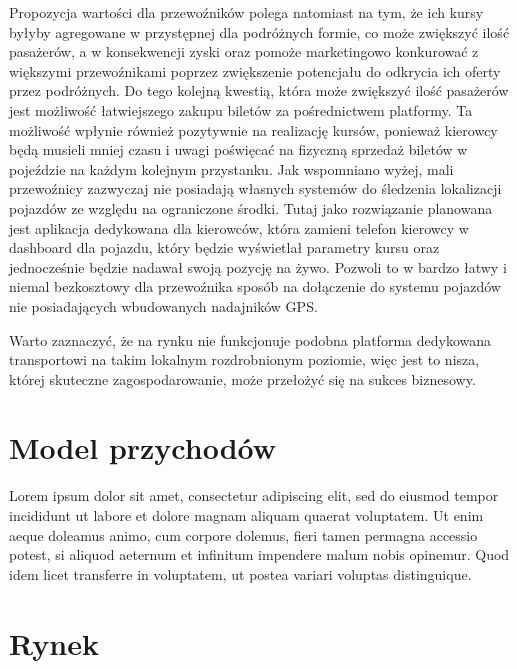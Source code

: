 Propozycja wartości dla przewoźników polega natomiast na tym, że ich kursy byłyby agregowane w przystępnej dla podróżnych formie, co może zwiększyć ilość pasażerów, a w konsekwencji zyski oraz pomoże marketingowo konkurować z większymi przewoźnikami poprzez zwiększenie potencjału do odkrycia ich oferty przez podróżnych. Do tego kolejną kwestią, która może zwiększyć ilość pasażerów jest możliwość łatwiejszego zakupu biletów za pośrednictwem platformy. Ta możliwość wpłynie również pozytywnie na realizację kursów, ponieważ kierowcy będą musieli mniej czasu i uwagi poświęcać na fizyczną sprzedaż biletów w pojeździe na każdym kolejnym przystanku. Jak wspomniano wyżej, mali przewoźnicy zazwyczaj nie posiadają własnych systemów do śledzenia lokalizacji pojazdów ze względu na ograniczone środki. Tutaj jako rozwiązanie planowana jest aplikacja dedykowana dla kierowców, która zamieni telefon kierowcy w dashboard dla pojazdu, który będzie wyświetlał parametry kursu oraz jednocześnie będzie nadawał swoją pozycję na żywo. Pozwoli to w bardzo łatwy i niemal bezkosztowy dla przewoźnika sposób na dołączenie do systemu pojazdów nie posiadających wbudowanych nadajników GPS.

Warto zaznaczyć, że na rynku nie funkcjonuje podobna platforma dedykowana transportowi na takim lokalnym rozdrobnionym poziomie, więc jest to nisza, której skuteczne zagospodarowanie, może przełożyć się na sukces biznesowy.

\section{Model przychodów}

Lorem ipsum dolor sit amet, consectetur adipiscing elit, sed do eiusmod tempor incididunt ut labore et dolore magnam aliquam quaerat voluptatem. Ut enim aeque doleamus animo, cum corpore dolemus, fieri tamen permagna accessio potest, si aliquod aeternum et infinitum impendere malum nobis opinemur. Quod idem licet transferre in voluptatem, ut postea variari voluptas distinguique.

\section{Rynek}
